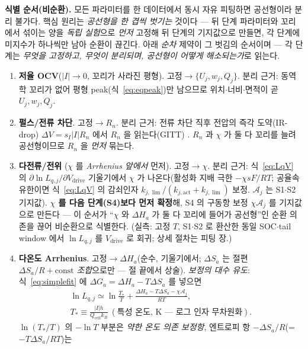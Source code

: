 \documentclass[11pt,a4paper]{article}
\newcommand{\drive}{\mathrm{drive}}
\newcommand{\cell}{\mathrm{cell}}
\begin{document}
\textbf{식별 순서(비순환).} 모든 파라미터를 한 데이터에서 동시 자유 피팅하면 공선형이라 분리 불가다. 핵심 원리는
\emph{공선형을 한 겹씩 벗기는} 것이다 — 뒤 단계 파라미터와 꼬리에서 섞이는 양을 \emph{독립 실험}으로 \emph{먼저}
고정해 뒤 단계의 기지값으로 만들면, 각 단계에 미지수가 하나씩만 남아 순환이 끊긴다. 아래 \emph{순차} 제약이 그
벗김의 순서이며 — 각 단계는 \emph{무엇을 고정하고, 무엇이 분리되며, 공선형이 어떻게 해소되는가}로 읽는다.
\begin{enumerate}[label=\textbf{S\arabic*.},leftmargin=2.6em,itemsep=2pt]
\item \textbf{저율 OCV}($|I|\to0$, 꼬리가 사라진 평형). 고정$\to\{U_j,w_j,Q_j\}$. 분리 근거: 동역학 꼬리가
  없어 평형 peak(식~\eqref{eq:eqpeak})만 남으므로 위치$\cdot$너비$\cdot$면적이 곧 $U_j,w_j,Q_j$.
\item \textbf{펄스/전류 차단}. 고정$\to R_n$. 분리 근거: 전류 차단 직후 전압의 즉각 도약(IR-drop) $\Delta V=
  s_I|I|R_n$ 에서 $R_n$ 을 읽는다(GITT) \cite{weppner1977}. $R_n$ 과 $\chi$ 가 둘 다 꼬리를 늘려 공선형이므로
  $R_n$ 을 \emph{먼저} 묶는다.
\item \textbf{다전류/전위} ($\chi$ 를 \emph{Arrhenius 앞에서} 먼저). 고정$\to\chi$. 분리 근거: 식~\eqref{eq:LqV} 의
  $\partial\ln L_{q,j}/\partial V_\drive$ 기울기에서 $\chi$ 가 나온다(활성화 지배 극한 $-\chi sF/RT$; 공율속 유한이면
  식~\eqref{eq:LqV} 의 감쇠인자 $k_{j,\lim}/(k_{j,\mathrm{act}}+k_{j,\lim})$ 보정. $\mathcal A_j$ 는 S1$\cdot$S2 기지값). \textbf{$\chi$ 를 다음 단계(S4)보다 먼저 확정}해, S4 의 구동항 보정 $\chi\mathcal A_j$ 를 기지값으로
  만든다 — 이 순서가 ``$\chi$ 와 $\Delta H_a$ 가 둘 다 꼬리에 들어가 공선형''인 순환 의존을 끊어 비순환으로 식별한다.
  (실측: 고정 $T$, S1$\cdot$S2 로 환산한 동일 SOC$\cdot$tail window 에서 $\ln L_{q,j}$ 를 $V_\drive$ 로 회귀; 상세 절차는 피팅 장.)
\item \textbf{다온도 Arrhenius}. 고정$\to\Delta H_a$(순수, 기울기에서; $\Delta S_a$ 는 절편 $\Delta S_a/R+\text{const}$
  \emph{조합}으로만 — 절 끝에서 상술). \emph{보정의 대수 유도}: 식~\eqref{eq:simplefit}
  에 $\Delta G_a=\Delta H_a-T\Delta S_a$ 를 넣으면
  \begin{equation*}
  \begin{gathered}
  \ln L_{q,j}\simeq\ln\frac{T_*}{T}+\frac{\Delta H_a-T\Delta S_a-\chi\mathcal A_j}{RT},\\[2pt]
  T_*\equiv\frac{|I|h}{Q_\cell k_B}\ (\text{특성 온도, K — 로그 인자 무차원화}).
  \end{gathered}
  \end{equation*}
  $\ln(T_*/T)$ 의 $-\ln T$ 부분은 \emph{약한 온도 의존 보정항}, 엔트로피 항 $-\Delta S_a/R$(=$-T\Delta S_a/RT$)는

\end{enumerate}
\end{document}
